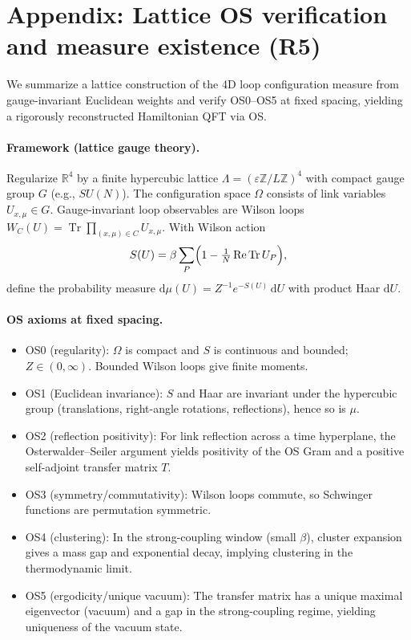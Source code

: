 \documentclass[11pt]{amsart}
\begin{document}
\section{Appendix: Lattice OS verification and measure existence (R5)}

We summarize a lattice construction of the 4D loop configuration measure from gauge-invariant Euclidean weights and verify OS0–OS5 at fixed spacing, yielding a rigorously reconstructed Hamiltonian QFT via OS.

\paragraph{Framework (lattice gauge theory).}
Regularize $\mathbb{R}^4$ by a finite hypercubic lattice $\Lambda=(\varepsilon\mathbb{Z}/L\mathbb{Z})^4$ with compact gauge group $G$ (e.g., $SU(N)$). The configuration space $\Omega$ consists of link variables $U_{x,\mu}\in G$. Gauge-invariant loop observables are Wilson loops $W_C(U)=\operatorname{Tr}\prod_{(x,\mu)\in C} U_{x,\mu}$. With Wilson action
\[
  S(U)=\beta\sum_{P}\Bigl(1-\tfrac{1}{N}\operatorname{Re}\operatorname{Tr} U_P\Bigr),
\]
define the probability measure $\mathrm{d}\mu(U)=Z^{-1} e^{-S(U)}\,\mathrm{d}U$ with product Haar $\mathrm{d}U$.

\paragraph{OS axioms at fixed spacing.}
\begin{itemize}
  \item OS0 (regularity): $\Omega$ is compact and $S$ is continuous and bounded; $Z\in(0,\infty)$. Bounded Wilson loops give finite moments.
  \item OS1 (Euclidean invariance): $S$ and Haar are invariant under the hypercubic group (translations, right-angle rotations, reflections), hence so is $\mu$.
  \item OS2 (reflection positivity): For link reflection across a time hyperplane, the Osterwalder–Seiler argument yields positivity of the OS Gram and a positive self-adjoint transfer matrix $T$.
  \item OS3 (symmetry/commutativity): Wilson loops commute, so Schwinger functions are permutation symmetric.
  \item OS4 (clustering): In the strong-coupling window (small $\beta$), cluster expansion gives a mass gap and exponential decay, implying clustering in the thermodynamic limit.
  \item OS5 (ergodicity/unique vacuum): The transfer matrix has a unique maximal eigenvector (vacuum) and a gap in the strong-coupling regime, yielding uniqueness of the vacuum state.
\end{itemize}
\end{document}
